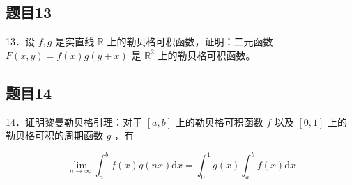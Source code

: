\documentclass{article}
\begin{document}
\subsection{题目13}
13．设 \(f, g\) 是实直线 \(\mathbb{R}\) 上的勒贝格可积函数，证明：二元函数 \(F(x, y)=f(x) g(y+x)\) 是 \(\mathbb{R}^{2}\) 上的勒贝格可积函数。

\subsection{题目14}
14．证明黎曼勒贝格引理：对于 \([a, b]\) 上的勒贝格可积函数 \(f\) 以及 \([0,1]\) 上的勒贝格可积的周期函数 \(g\) ，有

\[
\lim _{n \rightarrow \infty} \int_{a}^{b} f(x) g(n x) \mathrm{d} x=\int_{0}^{1} g(x) \int_{a}^{b} f(x) \mathrm{d} x
\]
\end{document}

